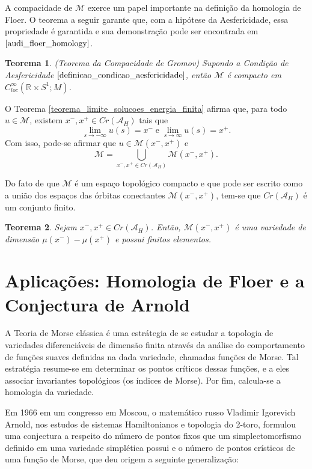\documentclass[12pt]{book}
\newtheorem{teorema}{Teorema}[section]
\newcommand{\circulo}{S^{1}}
\newcommand{\energiafinitaM}{\mathcal{M}}
\newcommand{\energiafinitaMconectante}{\energiafinitaM(x^{-}, x^{+})}
\newcommand{\funcionalH}{\mathcal{A}_{H}}
\newcommand{\pontoscriticos}[1]{\textit{Cr}(#1)}
\newcommand{\retacartesianocirculo}{\real{} \times \circulo}
\newcommand{\real}[1]{\mathbb{R}^{#1}}
\begin{document}
	A compacidade de $\energiafinitaM$ exerce um papel importante na definição da homologia de Floer. O teorema a seguir garante que, com a hipótese da Aesfericidade, essa propriedade é garantida e sua demonstração pode ser encontrada em $\cite{audi_floer_homology}$.
	
	\begin{teorema}\label{teorema_compacidade_gromov}
		(Teorema da Compacidade de Gromov) Supondo a Condição de Aesfericidade $\ref{definicao_condicao_aesfericidade}$, então $\energiafinitaM$ é compacto em $C^{\infty}_{loc}(\retacartesianocirculo; M)$.
	\end{teorema}
	
	O Teorema \ref{teorema_limite_solucoes_energia_finita} afirma que, para todo $u\in \energiafinitaM$, existem $x^{-}, x^{+}\in \pontoscriticos{\funcionalH}$ tais que 
	$$
	\lim_{s\to -\infty}u(s)=x^{-}\; \text{e} \; \lim_{s\to \infty}u(s)=x^{+}.
	$$
	Com isso, pode-se afirmar que $u\in \energiafinitaMconectante$ e 
	$$
	\energiafinitaM = \bigcup_{x^{-}, x^{+}\in  \pontoscriticos{\funcionalH}}\energiafinitaMconectante.
	$$

	Do fato de que $\energiafinitaM$ é um espaço topológico compacto e que pode ser escrito como a união dos espaços das órbitas conectantes $\energiafinitaMconectante$, tem-se que $\pontoscriticos{\funcionalH}$ é um conjunto finito.
	
	\begin{teorema}\label{teorema_orbitas_conectantes_finitas}
		Sejam $x^{-}, x^{+} \in \pontoscriticos{\funcionalH}$. Então, $\energiafinitaMconectante$ é uma variedade de dimensão $\mu(x^{-})-\mu(x^{+})$ e possui finitos elementos.
	\end{teorema}
		
	\chapter{Aplicações: Homologia de Floer e a Conjectura de Arnold}\label{capitulo_homologia_floer}
	
	A Teoria de Morse clássica é uma estrátegia de se estudar a topologia de variedades diferenciáveis de dimensão finita através da análise do comportamento de funções suaves definidas na dada variedade, chamadas funções de Morse. Tal estratégia resume-se em determinar os pontos críticos dessas funções, e a eles associar invariantes topológicos (os índices de Morse). Por fim, calcula-se a homologia da variedade.
	
	Em 1966 em um congresso em Moscou, o matemático russo Vladimir Igorevich Arnold, nos estudos de sistemas Hamiltonianos e topologia do 2-toro, formulou uma conjectura a respeito do número de pontos fixos que um simplectomorfismo definido em uma variedade simplética possui e o número de pontos crísticos de uma função de Morse, que deu origem a seguinte generalização:
	
\end{document}
